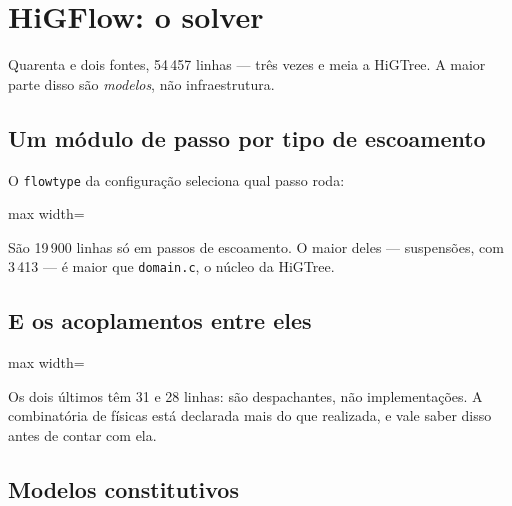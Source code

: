 \section{HiGFlow: o solver}

Quarenta e dois fontes, 54\,457 linhas --- tr\^es vezes e meia a HiGTree. A maior
parte disso s\~ao \emph{modelos}, n\~ao infraestrutura.

\subsection{Um m\'odulo de passo por tipo de escoamento}

O \texttt{flowtype} da configura\c{c}\~ao seleciona qual passo roda:

\begin{adjustbox}{max width=\linewidth}
\end{adjustbox}

S\~ao 19\,900 linhas s\'o em passos de escoamento. O maior deles ---
suspens\~oes, com 3\,413 --- \'e maior que \texttt{domain.c}, o n\'ucleo da
HiGTree.

\subsection{E os acoplamentos entre eles}

\begin{adjustbox}{max width=\linewidth}
\end{adjustbox}

Os dois \'ultimos t\^em 31 e 28 linhas: s\~ao despachantes, n\~ao
implementa\c{c}\~oes. A combinat\'oria de f\'isicas est\'a declarada mais do que
realizada, e vale saber disso antes de contar com ela.

\subsection{Modelos constitutivos}

